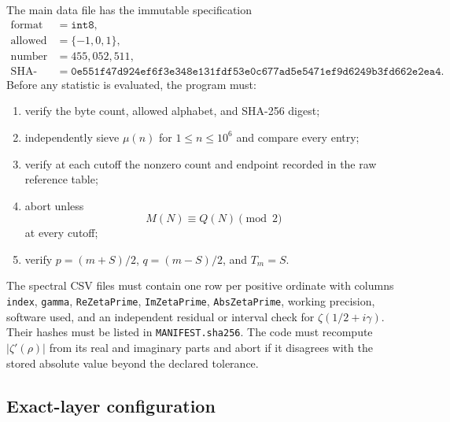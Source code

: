 \documentclass[11pt,reqno]{amsart}
\numberwithin{equation}{section}
\theoremstyle{plain}
\theoremstyle{definition}
\theoremstyle{remark}
\begin{document}
The main data file has the immutable specification
\begin{equation}
\begin{split}
\text{format}&=\texttt{int8},\\
\text{allowed values}&=\{-1,0,1\},\\
\text{number of bytes}&=455{,}052{,}511,\\
\text{SHA-256}&=
\texttt{0e551f47d924ef6f3e348e131fdf53e0c677ad5e5471ef9d6249b3fd662e2ea4}.
\end{split}
\label{eq:main-input-specification}
\end{equation}
Before any statistic is evaluated, the program must:
\begin{enumerate}[label=(\alph*)]
\item verify the byte count, allowed alphabet, and SHA-256 digest;
\item independently sieve \(\mu(n)\) for \(1\leq n\leq10^6\) and compare
every entry;
\item verify at each cutoff the nonzero count and endpoint recorded in the
raw reference table;
\item abort unless
\begin{equation}
M(N)\equiv Q(N)\pmod2
\label{eq:reproducibility-parity-test}
\end{equation}
at every cutoff;
\item verify \(p=(m+S)/2\), \(q=(m-S)/2\), and \(T_m=S\).
\end{enumerate}

The spectral CSV files must contain one row per positive ordinate with columns
\texttt{index}, \texttt{gamma}, \texttt{ReZetaPrime},
\texttt{ImZetaPrime}, \texttt{AbsZetaPrime}, working precision, software
used, and an independent residual or interval check for
\(\zeta(1/2+i\gamma)\).  Their hashes must be listed in
\texttt{MANIFEST.sha256}.  The code must recompute
\(|\zeta'(\rho)|\) from its real and imaginary parts and abort if it disagrees
with the stored absolute value beyond the declared tolerance.

\subsection{Exact-layer configuration}
\label{subsec:exact-layer-configuration}
\end{document}
